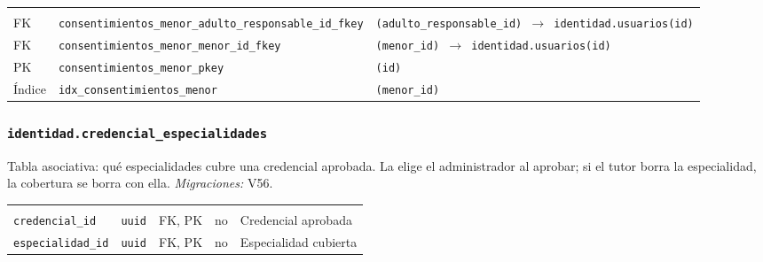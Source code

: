 {\small
\begin{xltabular}{\textwidth}{@{}>{\raggedright\arraybackslash}p{1.7cm} >{\raggedright\arraybackslash}p{4.6cm} L@{}}
    \toprule
     &  &  \\
    \midrule
    \endfirsthead
    \toprule
     &  &  \\
    \midrule
    \endhead
    \bottomrule
    \endfoot
    FK & \texttt{consentimientos\_\allowbreak{}menor\_\allowbreak{}adulto\_\allowbreak{}responsable\_\allowbreak{}id\_\allowbreak{}fkey} & \texttt{(\allowbreak{}adulto\_\allowbreak{}responsable\_\allowbreak{}id) $\rightarrow$ identidad.usuarios(\allowbreak{}id)} \\
    FK & \texttt{consentimientos\_\allowbreak{}menor\_\allowbreak{}menor\_\allowbreak{}id\_\allowbreak{}fkey} & \texttt{(\allowbreak{}menor\_\allowbreak{}id) $\rightarrow$ identidad.usuarios(\allowbreak{}id)} \\
    PK & \texttt{consentimientos\_\allowbreak{}menor\_\allowbreak{}pkey} & \texttt{(\allowbreak{}id)} \\
    Índice & \texttt{idx\_\allowbreak{}consentimientos\_\allowbreak{}menor} & \texttt{(\allowbreak{}menor\_\allowbreak{}id)} \\
\end{xltabular}
}

\subsubsection{\texorpdfstring{\texttt{identidad.credencial\_\allowbreak{}especialidades}}{identidad.credencial\_especialidades}}\label{dd:identidad.credencial_especialidades}

Tabla asociativa: qué especialidades cubre una credencial aprobada. La elige el administrador al aprobar; si el tutor borra la especialidad, la cobertura se borra con ella. \emph{Migraciones:} V56.

{\small
\begin{xltabular}{\textwidth}{@{}>{\raggedright\arraybackslash}p{3.6cm} >{\raggedright\arraybackslash}p{2.3cm} >{\raggedright\arraybackslash}p{1cm} >{\centering\arraybackslash}p{0.85cm} L@{}}
    \toprule
     &  &  &  &  \\
    \midrule
    \endfirsthead
    \toprule
     &  &  &  &  \\
    \midrule
    \endhead
    \bottomrule
    \endfoot
    \texttt{credencial\_\allowbreak{}id} & \texttt{uuid} & FK, PK & no & Credencial aprobada \\
    \texttt{especialidad\_\allowbreak{}id} & \texttt{uuid} & FK, PK & no & Especialidad cubierta \\
\end{xltabular}
}

